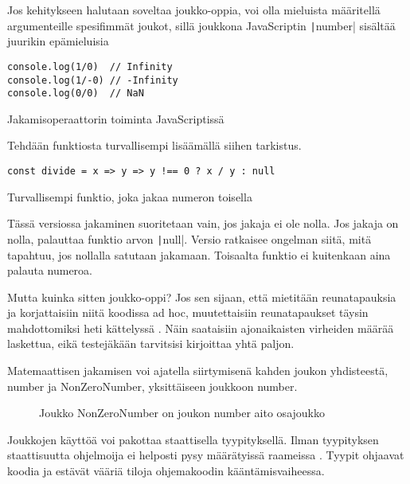 Jos kehitykseen halutaan soveltaa joukko-oppia, voi olla mieluista määritellä argumenteille spesifimmät joukot, sillä joukkona JavaScriptin \texttt|number| sisältää juurikin epämieluisia

\begin{code}
    \begin{verbatim}
console.log(1/0)  // Infinity
console.log(1/-0) // -Infinity
console.log(0/0)  // NaN
\end{verbatim}
    \caption{Jakamisoperaattorin toiminta JavaScriptissä}
    \label{code:ts_division}
\end{code}



Tehdään funktiosta turvallisempi lisäämällä siihen tarkistus.


\begin{code}
    \begin{verbatim}
const divide = x => y => y !== 0 ? x / y : null
\end{verbatim}
    \caption{Turvallisempi funktio, joka jakaa numeron toisella}
    \label{code:ts_set_theory_4}
\end{code}

Tässä versiossa jakaminen suoritetaan vain, jos jakaja ei ole nolla. Jos jakaja on nolla, palauttaa funktio arvon \texttt|null|. Versio ratkaisee ongelman siitä, mitä tapahtuu, jos nollalla satutaan jakamaan. Toisaalta funktio ei kuitenkaan aina palauta numeroa.

Mutta kuinka sitten joukko-oppi? Jos sen sijaan, että mietitään reunatapauksia ja korjattaisiin niitä koodissa ad hoc, muutettaisiin reunatapaukset täysin mahdottomiksi heti kättelyssä \cite{impossiblebetter}. Näin saataisiin ajonaikaisten virheiden määrää laskettua, eikä testejäkään tarvitsisi kirjoittaa yhtä paljon.

Matemaattisen jakamisen voi ajatella siirtymisenä kahden joukon yhdisteestä, number ja NonZeroNumber, yksittäiseen joukkoon number.

\begin{figure}[ht]
    \centering
    \caption{Joukko NonZeroNumber on joukon number aito osajoukko}
    \label{fig:set-esimerkki}
\end{figure}

Joukkojen käyttöä voi pakottaa staattisella tyypityksellä. Ilman tyypityksen staattisuutta ohjelmoija ei helposti pysy määrätyissä raameissa \cite[44]{cantarella_fp_haitat}. Tyypit ohjaavat koodia ja estävät vääriä tiloja ohjemakoodin kääntämisvaiheessa.

